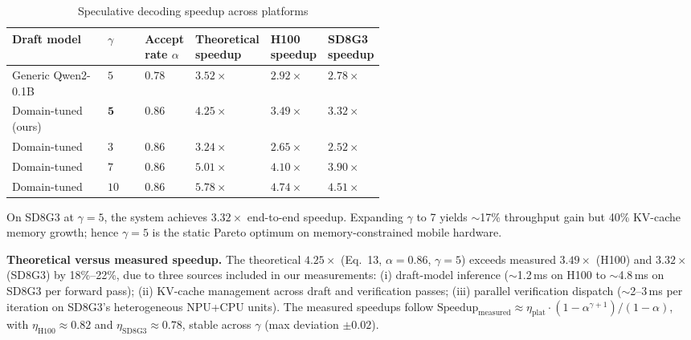 \documentclass[11pt, a4paper]{article}
\begin{document}
\begin{table}[htbp]
\centering
\caption{Speculative decoding speedup across platforms}
\label{tab:speculative_decoding-en}
\small
\renewcommand{\arraystretch}{1.2}
\begin{tabular}{l>{\centering\arraybackslash}p{0.1\linewidth}>{\centering\arraybackslash}p{0.13\linewidth}>{\centering\arraybackslash}p{0.11\linewidth}>{\centering\arraybackslash}p{0.1\linewidth}>{\centering\arraybackslash}p{0.1\linewidth}}
\toprule
\textbf{Draft model} & \textbf{$\gamma$} & \textbf{Accept rate $\alpha$} & \textbf{Theoretical speedup} & \textbf{H100 speedup} & \textbf{SD8G3 speedup} \\
\midrule
Generic Qwen2-0.1B & $5$ & $0.78$ & $3.52\times$ & $2.92\times$ & $2.78\times$ \\
Domain-tuned (ours) & $\mathbf{5}$ & $\mathbf{0.86}$ & $\mathbf{4.25\times}$ & $\mathbf{3.49\times}$ & $\mathbf{3.32\times}$ \\
Domain-tuned & $3$ & $0.86$ & $3.24\times$ & $2.65\times$ & $2.52\times$ \\
Domain-tuned & $7$ & $0.86$ & $5.01\times$ & $4.10\times$ & $3.90\times$ \\
Domain-tuned & $10$ & $0.86$ & $5.78\times$ & $4.74\times$ & $4.51\times$ \\
\bottomrule
\end{tabular}
\end{table}

On SD8G3 at $\gamma = 5$, the system achieves $3.32\times$ end-to-end speedup. Expanding $\gamma$ to 7 yields $\sim$17\% throughput gain but 40\% KV-cache memory growth; hence $\gamma = 5$ is the static Pareto optimum on memory-constrained mobile hardware.

\medskip
\noindent\textbf{Theoretical versus measured speedup.} The theoretical $4.25\times$ (Eq.~13, $\alpha=0.86$, $\gamma=5$) exceeds measured $3.49\times$ (H100) and $3.32\times$ (SD8G3) by 18\%--22\%, due to three sources included in our measurements: (i) draft-model inference ($\sim$1.2\,ms on H100 to $\sim$4.8\,ms on SD8G3 per forward pass); (ii) KV-cache management across draft and verification passes; (iii) parallel verification dispatch ($\sim$2--3\,ms per iteration on SD8G3's heterogeneous NPU+CPU units). The measured speedups follow $\text{Speedup}_{\text{measured}} \approx \eta_{\text{plat}}\cdot (1-\alpha^{\gamma+1})/(1-\alpha)$, with $\eta_{\text{H100}} \approx 0.82$ and $\eta_{\text{SD8G3}} \approx 0.78$, stable across $\gamma$ (max deviation $\pm 0.02$).
\end{document}
